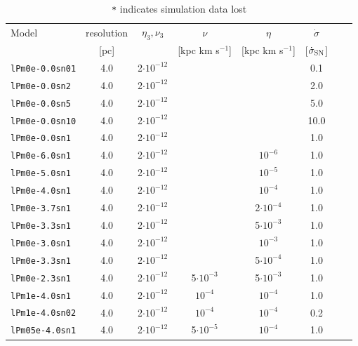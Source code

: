 \documentclass[preprint2]{aastex63}
\begin{document}
\begin{table}
\caption{\texttt{*} indicates simulation data lost}
\begin{tabular}{lccccccc}
Model            & resolution & $\eta_3,\nu_3$      & $\nu$            & $\eta$          & $\dot\sigma$  \\
                 & [pc]       &                     & [kpc km s$^{-1}$]&[kpc km s$^{-1}$]&[$\dot\sigma_{\rm SN}$] \\
\texttt{lPm0e-0.0sn01}  & 4.0 & 2$\cdot10^{-12}$    &                  &                 & 0.1  \\
\texttt{lPm0e-0.0sn2}   & 4.0 & 2$\cdot10^{-12}$    &                  &                 & 2.0  \\
\texttt{lPm0e-0.0sn5}   & 4.0 & 2$\cdot10^{-12}$    &                  &                 & 5.0  \\
\texttt{lPm0e-0.0sn10}  & 4.0 & 2$\cdot10^{-12}$    &                  &                 & 10.0 \\
\texttt{lPm0e-0.0sn1}   & 4.0 & 2$\cdot10^{-12}$    &                  &                 &  1.0 \\
\texttt{lPm0e-6.0sn1}   & 4.0 & 2$\cdot10^{-12}$    &                  & $     10^{-6}$  &  1.0 \\
\texttt{lPm0e-5.0sn1}   & 4.0 & 2$\cdot10^{-12}$    &                  & $     10^{-5}$  &  1.0 \\
\texttt{lPm0e-4.0sn1}   & 4.0 & 2$\cdot10^{-12}$    &                  & $     10^{-4}$  &  1.0 \\
\texttt{lPm0e-3.7sn1}   & 4.0 & 2$\cdot10^{-12}$    &                  & 2$\cdot10^{-4}$ &  1.0 \\
\texttt{lPm0e-3.3sn1}   & 4.0 & 2$\cdot10^{-12}$    &                  & 5$\cdot10^{-3}$ &  1.0 \\
\texttt{lPm0e-3.0sn1}   & 4.0 & 2$\cdot10^{-12}$    &                  & $     10^{-3}$  &  1.0 \\
\texttt{lPm0e-3.3sn1}   & 4.0 & 2$\cdot10^{-12}$    &                  & 5$\cdot10^{-4}$ &  1.0 \\
\texttt{lPm0e-2.3sn1}   & 4.0 & 2$\cdot10^{-12}$    & 5$\cdot10^{-3}$  & 5$\cdot10^{-3}$ &  1.0 \\
\texttt{lPm1e-4.0sn1}   & 4.0 & 2$\cdot10^{-12}$    &       $10^{-4}$  &       $10^{-4}$ &  1.0 \\    
\texttt{lPm1e-4.0sn02}  & 4.0 & 2$\cdot10^{-12}$    &       $10^{-4}$  &       $10^{-4}$ & 0.2  \\    
\texttt{lPm05e-4.0sn1}  & 4.0 & 2$\cdot10^{-12}$    & 5$\cdot10^{-5}$  &       $10^{-4}$ &  1.0 \\    

\end{tabular}
\end{table}
\end{document}
